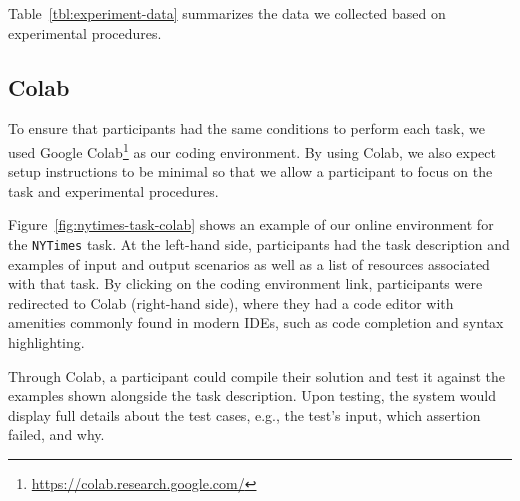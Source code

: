 {%






Table~\ref{tbl:experiment-data} summarizes the data we collected based on experimental procedures.




\subsection{Colab}
\label{cp6:environment}


To ensure that participants had the same conditions to perform each task, we used Google Colab\footnote{\url{https://colab.research.google.com/}} as our coding environment. 
By using Colab, we also expect setup instructions to be minimal 
so that we allow a participant to focus on the task and experimental procedures.



Figure~\ref{fig:nytimes-task-colab} shows an example of our online environment for the \texttt{NYTimes} task.
At the left-hand side, participants had the task description and examples of input and output scenarios as well as a list of resources associated with that task. 
By clicking on the coding environment link, participants were redirected to Colab (right-hand side),
where they had a code editor with amenities commonly found in modern IDEs, such as code completion and syntax highlighting. 



Through Colab, a participant could compile their solution and test it against the examples shown alongside the task description.
Upon testing, the system would display full details about the test cases, e.g., the test's input, which assertion failed, and why. 




}
